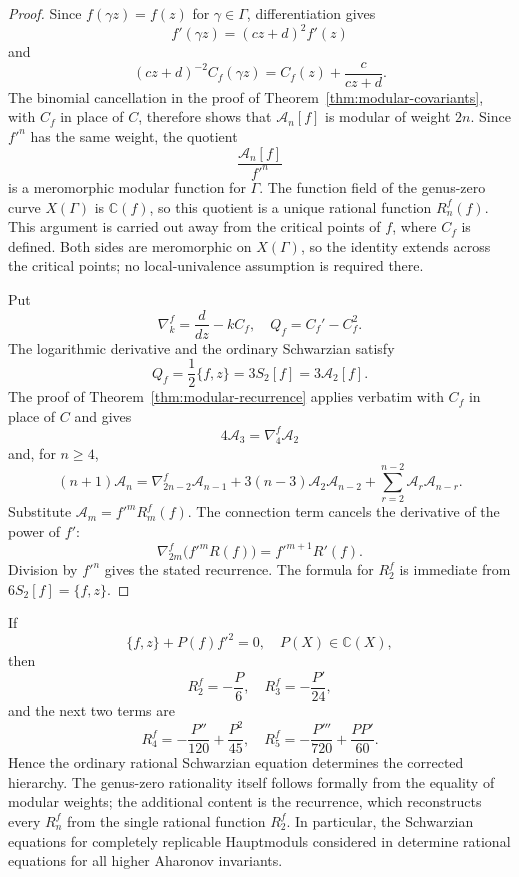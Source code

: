 \documentclass[11pt]{amsart}
\theoremstyle{definition}
\theoremstyle{remark}
\numberwithin{equation}{section}
\begin{document}
\begin{proof}
Since $f(\gamma z)=f(z)$ for $\gamma\in\Gamma$, differentiation gives
\[
f'(\gamma z)=(cz+d)^2f'(z)
\]
and
\[
(cz+d)^{-2}C_f(\gamma z)
=
C_f(z)+\frac{c}{cz+d}.
\]
The binomial cancellation in the proof of Theorem~\ref{thm:modular-covariants}, with $C_f$ in place of $C$, therefore shows that $\mathcal A_n[f]$ is modular of weight $2n$. Since $f'^n$ has the same weight, the quotient
\[
\frac{\mathcal A_n[f]}{f'^n}
\]
is a meromorphic modular function for $\Gamma$. The function field of the genus-zero curve $X(\Gamma)$ is $\mathbb C(f)$, so this quotient is a unique rational function $R_n^f(f)$.  This argument is carried out away from the critical points of $f$, where $C_f$ is defined.  Both sides are meromorphic on $X(\Gamma)$, so the identity extends across the critical points; no local-univalence assumption is required there.

Put
\[
\nabla_k^f=\frac{d}{dz}-kC_f,
\quad
Q_f=C_f'-C_f^2.
\]
The logarithmic derivative and the ordinary Schwarzian satisfy
\[
Q_f=\frac12\{f,z\}=3S_2[f]=3\mathcal A_2[f].
\]
The proof of Theorem~\ref{thm:modular-recurrence} applies verbatim with $C_f$ in place of $C$ and gives
\[
4\mathcal A_3=\nabla_4^f\mathcal A_2
\]
and, for $n\geq4$,
\[
(n+1)\mathcal A_n
=
\nabla_{2n-2}^f\mathcal A_{n-1}
+3(n-3)\mathcal A_2\mathcal A_{n-2}
+\sum_{r=2}^{n-2}\mathcal A_r\mathcal A_{n-r}.
\]
Substitute $\mathcal A_m=f'^mR_m^f(f)$. The connection term cancels the derivative of the power of $f'$:
\[
\nabla_{2m}^f\bigl(f'^mR(f)\bigr)
=f'^{m+1}R'(f).
\]
Division by $f'^n$ gives the stated recurrence. The formula for $R_2^f$ is immediate from $6S_2[f]=\{f,z\}$.
\end{proof}

If
\[
\{f,z\}+P(f)f'^2=0,
\quad P(X)\in\mathbb C(X),
\]
then
\[
R_2^f=-\frac{P}{6},
\quad
R_3^f=-\frac{P'}{24},
\]
and the next two terms are
\[
R_4^f=-\frac{P''}{120}+\frac{P^2}{45},
\quad
R_5^f=-\frac{P'''}{720}+\frac{PP'}{60}.
\]
Hence the ordinary rational Schwarzian equation determines the corrected hierarchy.  The genus-zero rationality itself follows formally from the equality of modular weights; the additional content is the recurrence, which reconstructs every $R_n^f$ from the single rational function $R_2^f$.  In particular, the Schwarzian equations for completely replicable Hauptmoduls considered in \cite{elbasraoui-mckay} determine rational equations for all higher Aharonov invariants.
\end{document}
